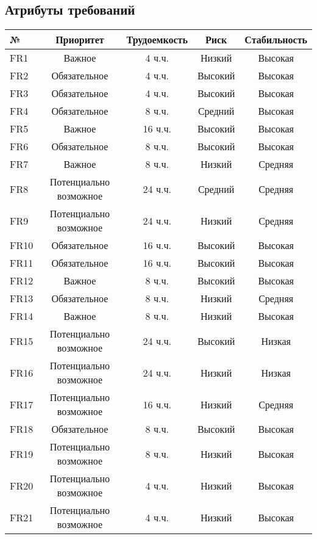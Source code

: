 \subsection{Атрибуты требований}
\begin{longtable}{|l|c|c|c|c|}
    \hline № & Приоритет & Трудоемкость & Риск & Стабильность \\
    \endhead
    \hline FR1  & Важное       &  4 ч.ч. & Низкий & Высокая \\
    \hline FR2  & Обязательное &  4 ч.ч. & Высокий & Высокая \\
    \hline FR3  & Обязательное &  4 ч.ч. & Высокий & Высокая \\
    \hline FR4  & Обязательное &  8 ч.ч. & Средний & Высокая \\
    \hline FR5  & Важное       & 16 ч.ч. & Высокий & Высокая \\
    \hline FR6  & Обязательное &  8 ч.ч. & Высокий & Высокая \\
    \hline FR7  & Важное       &  8 ч.ч. & Низкий & Средняя \\
    \hline FR8  & Потенциально возможное & 24 ч.ч. & Средний & Средняя \\
    \hline FR9  & Потенциально возможное & 24 ч.ч. & Низкий & Средняя \\
    \hline FR10 & Обязательное & 16 ч.ч. & Высокий & Высокая \\
    \hline FR11 & Обязательное & 16 ч.ч. & Высокий & Высокая \\
    \hline FR12 & Важное       &  8 ч.ч. & Высокий & Высокая \\
    \hline FR13 & Обязательное &  8 ч.ч. & Низкий & Средняя \\
    \hline FR14 & Важное       &  8 ч.ч. & Низкий & Высокая \\
    \hline FR15 & Потенциально возможное & 24 ч.ч. & Высокий & Низкая \\
    \hline FR16 & Потенциально возможное & 24 ч.ч. & Низкий & Низкая \\
    \hline FR17 & Потенциально возможное & 16 ч.ч. & Низкий & Средняя \\
    \hline FR18 & Обязательное &  8 ч.ч. & Высокий & Высокая \\
    \hline FR19 & Потенциально возможное &  8 ч.ч. & Низкий & Высокая \\
    \hline FR20 & Потенциально возможное &  4 ч.ч. & Низкий & Высокая \\
    \hline FR21 & Потенциально возможное &  4 ч.ч. & Низкий & Высокая \\

\end{longtable}
